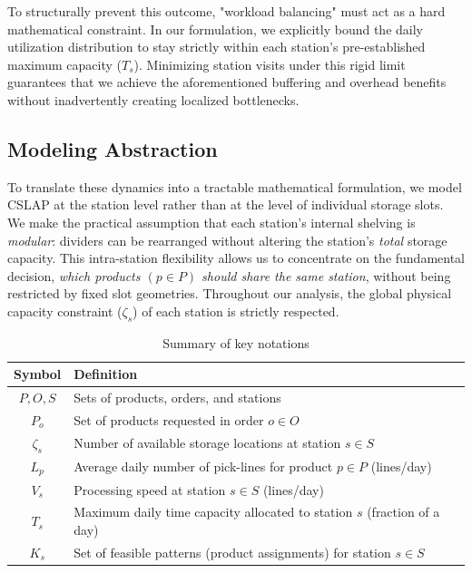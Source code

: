 \documentclass[preprint,review,11pt,authoryear]{elsarticle}
\begin{document}
To structurally prevent this outcome, "workload balancing" must act as a hard mathematical constraint. In our formulation, we explicitly bound the daily utilization distribution to stay strictly within each station's pre-established maximum capacity ($T_s$). Minimizing station visits under this rigid limit guarantees that we achieve the aforementioned buffering and overhead benefits without inadvertently creating localized bottlenecks.

\subsection{Modeling Abstraction}
To translate these dynamics into a tractable mathematical formulation, we model CSLAP at the station level rather than at the level of individual storage slots. We make the practical assumption that each station’s internal shelving is \emph{modular}: dividers can be rearranged without altering the station’s \emph{total} storage capacity. This intra-station flexibility allows us to concentrate on the fundamental decision, \emph{which products $(p \in P)$ should share the same station}, without being restricted by fixed slot geometries. Throughout our analysis, the global physical capacity constraint ($\zeta_s$) of each station is strictly respected.


\begin{table}[H]
\centering
\small 
\begin{tabular}{cl}
\toprule
\textbf{Symbol} & \textbf{Definition}\\
\midrule
$P, O, S$ & Sets of products, orders, and stations\\
$P_o$ & Set of products requested in order $o \in O$\\
$\zeta_s$ & Number of available storage locations at station $s \in S$\\
$L_p$ & Average daily number of pick-lines for product $p \in P$ (lines/day)\\
$V_s$ & Processing speed at station $s \in S$ (lines/day)\\
$T_s$ & Maximum daily time capacity allocated to station $s$ (fraction of a day)\\
$K_s$ & Set of feasible patterns (product assignments) for station $s \in S$\\
\bottomrule
\end{tabular}
\caption*{Summary of key notations}
\label{tab:notation}
\end{table}
\end{document}
